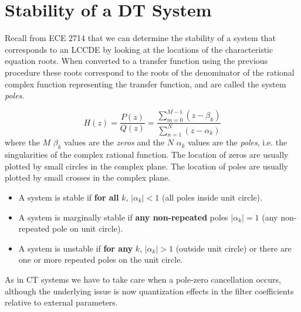 \documentclass{article}
\begin{document}
\section{Stability of a DT System}

Recall from ECE 2714 that we can determine the stability of a system that corresponds to an LCCDE by looking at the locations of the characteristic equation roots. When converted to a transfer function using the previous procedure these roots correspond to the roots of the denominator of the rational complex function representing the transfer function, and are called the system \textit{poles}.

\[
H(z) = \frac{P(z)}{Q(z)} = \frac{\sum\limits_{m=0}^{M-1} (z-\beta_k)}{\sum\limits_{n=1}^{N} (z-\alpha_k)}
\]
where the $M$ $\beta_k$ values are the \textit{zeros} and the $N$ $\alpha_k$ values are the \textit{poles}, i.e. the singularities of the complex rational function. The location of zeros are usually plotted by small circles in the complex plane. The location of poles are usually plotted by small crosses in the complex plane. 

\begin{itemize}
\item A system is stable if \textbf{for all} $k$, $|\alpha_k| < 1$ (all poles inside unit circle).
\item A system is marginally stable if \textbf{any non-repeated} poles $|\alpha_k| = 1$ (any non-repeated pole on unit circle).
\item A system is unstable if \textbf{for any} $k$, $|\alpha_k| > 1$ (outside unit circle) or there are one or more repeated poles on the unit circle.
\end{itemize}

As in CT systems we have to take care when a pole-zero cancellation occurs, although the underlying issue is now quantization effects in the filter coefficients relative to external parameters.
\end{document}
